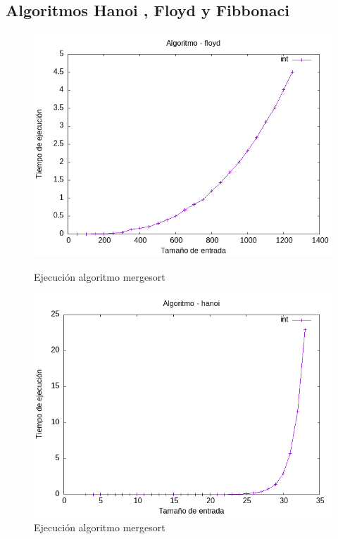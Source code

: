 \documentclass[11pt]{article}
\begin{document}
    \subsection{Algoritmos Hanoi , Floyd y Fibbonaci}
    \begin{figure}[H]
        \begin{minipage}{0.5\textwidth}
            \centering
            \includegraphics[width=\linewidth]{assets/Img/floydint.png}
            \caption{Ejecución algoritmo mergesort}
            \label{fig:mergesort}
        \end{minipage}
        \begin{minipage}{0.5\textwidth}
            \centering
            \includegraphics[width=\linewidth]{assets/Img/hanoiint.png}
            \caption{Ejecución algoritmo mergesort}
            \label{fig:mergesort}
        \end{minipage}
    \end{figure}
\end{document}
